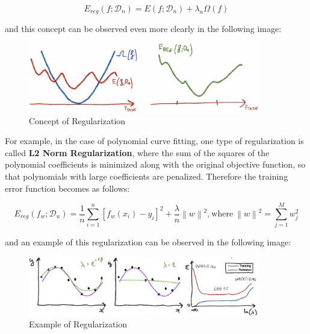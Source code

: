 \newpage

\begin{equation*}
      E_{reg}(f; \mathcal{D}_n) = E(f; \mathcal{D}_n) + \lambda_n \Omega(f)
\end{equation*}

\vspace{2mm}

and this concept can be observed even more clearly in the following image:

\begin{figure}[h]
      \centering
      \includegraphics[width=0.9\textwidth]{../img/Regularization}
      \caption{Concept of Regularization}
\end{figure}

For example, in the case of polynomial curve fitting, one type of regularization
is called \textbf{L2 Norm Regularization}, where the sum of the squares of the
polynomial coefficients is minimized along with the original objective function,
so that polynomials with large coefficients are penalized. Therefore the training
error function becomes as follows:

\begin{equation*}
      E_{reg}(f_w; \mathcal{D}_n) = \frac{1}{n} \sum_{i = 1}^{n} [f_w(x_i) - y_i]^2 +
      \frac{\lambda}{n}{\left\lVert w\right\rVert}^2 \text{,} \ \text{where} \
      {\left\lVert w\right\rVert}^2 = \sum_{j = 1}^{M} w_j^2
\end{equation*}

\vspace{3mm}

and an example of this regularization can be observed in the following image:

\begin{figure}[h]
      \centering
      \includegraphics[width=0.9\textwidth]{../img/Regularization_PCF}
      \caption{Example of Regularization}
\end{figure}


